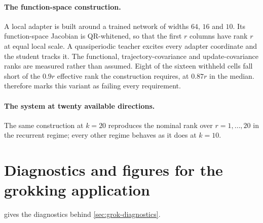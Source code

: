 \documentclass[twoside]{article}
\begin{document}
\paragraph{The function-space construction.} A local adapter is built around a trained network of
widths $64$, $16$ and $10$. Its function-space Jacobian is QR-whitened, so that the first
$r$ columns have rank $r$ at equal local scale. A quasiperiodic teacher excites every adapter
coordinate and the student tracks it. The
functional, trajectory-covariance and update-covariance ranks are measured rather than assumed.
Eight of the sixteen withheld cells fall short of the $0.9r$ effective rank the construction
requires, at $0.87r$ in the median.  therefore marks this variant as failing every
requirement.

\paragraph{The system at twenty available directions.} The same construction at $k = 20$
reproduces the nominal rank over $r = 1, \dots, 20$ in the recurrent regime; every other regime
behaves as it does at $k = 10$.

\section{Diagnostics and figures for the grokking application}\label{app:pairs}

 gives the diagnostics behind \cref{sec:grok-diagnostics}.
\end{document}
